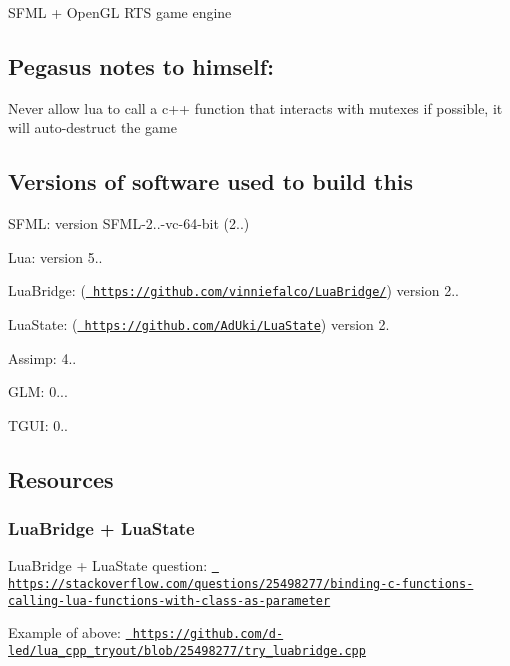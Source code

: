 S\+F\+ML + Open\+GL R\+TS game engine

\subsection*{Pegasus\textquotesingle{} notes to himself\+:}


\begin{DoxyItemize}
\item Never allow lua to call a c++ function that interacts with mutexes if possible, it will auto-\/destruct the game
\end{DoxyItemize}

\subsection*{Versions of software used to build this}

S\+F\+ML\+: version S\+F\+M\+L-\/2..-\/vc-\/64-\/bit (2..)

Lua\+: version 5..

Lua\+Bridge\+: (\href{https://github.com/vinniefalco/LuaBridge/}{\texttt{ https\+://github.\+com/vinniefalco/\+Lua\+Bridge/}}) version 2..

Lua\+State\+: (\href{https://github.com/AdUki/LuaState}{\texttt{ https\+://github.\+com/\+Ad\+Uki/\+Lua\+State}}) version 2.

Assimp\+: 4..

G\+LM\+: 0...

T\+G\+UI\+: 0..

\subsection*{Resources}

\subsubsection*{Lua\+Bridge + Lua\+State}

Lua\+Bridge + Lua\+State question\+: \href{https://stackoverflow.com/questions/25498277/binding-c-functions-calling-lua-functions-with-class-as-parameter}{\texttt{ https\+://stackoverflow.\+com/questions/25498277/binding-\/c-\/functions-\/calling-\/lua-\/functions-\/with-\/class-\/as-\/parameter}}

Example of above\+: \href{https://github.com/d-led/lua_cpp_tryout/blob/25498277/try_luabridge.cpp}{\texttt{ https\+://github.\+com/d-\/led/lua\+\_\+cpp\+\_\+tryout/blob/25498277/try\+\_\+luabridge.\+cpp}}

